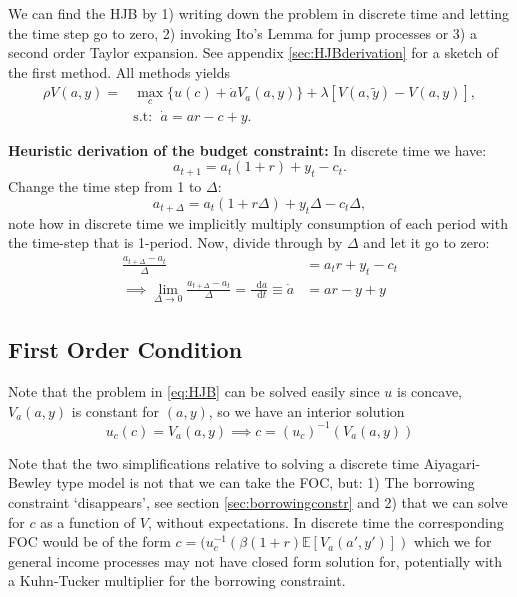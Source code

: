 \documentclass[12pt]{article}
\newcommand{\E}{\mathbb{E}}
\DeclareMathOperator{\1}{\mathbbm{1}}
\newcommand*\diff{\mathop{}\!\mathrm{d}}
\begin{document}
We can find the HJB by 1) writing down the problem in discrete time and letting the time step go to zero, 2) invoking Ito's Lemma for jump processes or 3) a second order Taylor expansion. See appendix \ref{sec:HJBderivation} for a sketch of the first method. All methods yields
\begin{align}\label{eq:HJB}
\rho V(a,y) =& \max_{c} \big\{ u(c) + \dot a V_a(a,y) \big\} + \lambda [V(a,\tilde y) - V(a,y)],\\
&\text{s.t: }\; \dot a = a r - c + y.
\end{align}

\textbf{Heuristic derivation of the budget constraint:}\newline
In discrete time we have:
\begin{equation*}
a_{t+1} = a_t(1+r) + y_t - c_t.
\end{equation*}
Change the time step from 1 to $\Delta$: 
\begin{equation*}
a_{t+\Delta} = a_t(1+r\Delta) + y_t\Delta - c_t\Delta,
\end{equation*}
note how in discrete time we implicitly multiply consumption of each period with the time-step that is 1-period. Now, divide through by $\Delta$ and let it go to zero:
\begin{align*}
\frac{a_{t+\Delta}-a_t}{\Delta} &= a_tr+ y_t- c_t \\
\implies \lim_{\Delta\to 0} \frac{a_{t+\Delta}-a_t}{\Delta} = \frac{\diff a}{\diff t} \equiv \dot a &= ar - y +y
\end{align*}

\subsection{First Order Condition}
Note that the problem in \eqref{eq:HJB} can be solved easily since $u$ is concave, $V_a(a,y)$ is constant for $(a,y)$, so we have an interior solution
\begin{equation}
u_c(c)=V_a(a,y) \implies c=(u_c)^{-1} \left( V_a(a,y) \right )
\end{equation}

Note that the two simplifications relative to solving a discrete time Aiyagari-Bewley type model is not that we can take the FOC, but: 1) The borrowing constraint `disappears', see section \ref{sec:borrowingconstr} and 2) that we can solve for $c$ as a function of $V$, without expectations. In discrete time the corresponding FOC would be of the form $c=(u_c^{-1}\left(\beta(1+r)\E [V_a(a',y')]\right)$ which we for general income processes may not have closed form solution for, potentially with a Kuhn-Tucker multiplier for the borrowing constraint.
\end{document}
